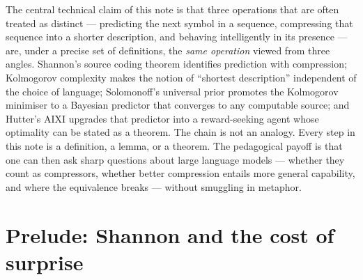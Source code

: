 \documentclass[12pt,a4paper]{article}
\theoremstyle{plain}
\theoremstyle{definition}
\begin{document}
The central technical claim of this note is that three operations that
are often treated as distinct --- predicting the next symbol in a
sequence, compressing that sequence into a shorter description, and
behaving intelligently in its presence --- are, under a precise set of
definitions, the \emph{same operation} viewed from three angles.
Shannon's source coding theorem \citep{shannon1948mathematical}
identifies prediction with compression; Kolmogorov complexity
\citep{kolmogorov1965three} makes the notion of ``shortest
description'' independent of the choice of language; Solomonoff's
universal prior \citep{solomonoff1964formal} promotes the Kolmogorov
minimiser to a Bayesian predictor that converges to any computable
source; and Hutter's AIXI \citep{hutter2005universal} upgrades that
predictor into a reward-seeking agent whose optimality can be stated
as a theorem.  The chain is not an analogy.  Every step in this note
is a definition, a lemma, or a theorem.  The pedagogical payoff is
that one can then ask sharp questions about large language models ---
whether they count as compressors, whether better compression entails
more general capability, and where the equivalence breaks --- without
smuggling in metaphor.

\section{Prelude: Shannon and the cost of surprise}
\label{sec:shannon-prelude}
\end{document}
